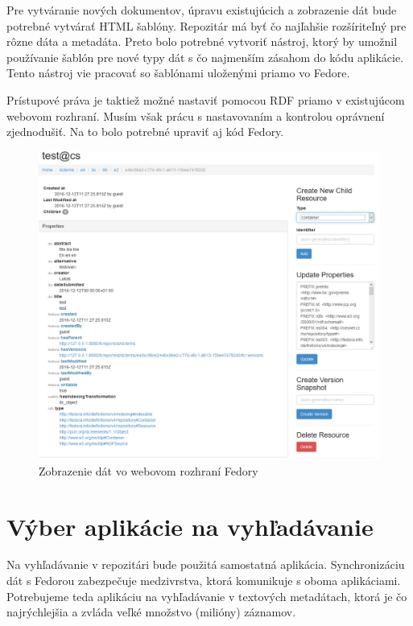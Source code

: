 \documentclass[thesis=M,slovak]{FITthesis}[2013/05/06]
\begin{document}
Pre vytváranie nových dokumentov, úpravu existujúcich a zobrazenie dát bude potrebné vytvárať HTML šablóny. Repozitár má byť čo najľahšie rozšíriteľný pre rôzne dáta a metadáta. Preto bolo potrebné vytvoriť nástroj, ktorý by umožnil používanie šablón pre nové typy dát s čo najmenším zásahom do kódu aplikácie. Tento nástroj vie pracovať so šablónami uloženými priamo vo Fedore.

Prístupové práva je taktiež možné nastaviť pomocou RDF priamo v existujúcom webovom rozhraní. Musím však prácu s nastavovaním a kontrolou oprávnení zjednodušiť. Na to bolo potrebné upraviť aj kód Fedory.

\begin{figure}\centering
	\includegraphics[width=1.0\textwidth]{fedora/dcterms_vo_Fedore.png}
 	\caption[Zobrazenie dát vo webovom rozhraní Fedory]{Zobrazenie dát vo webovom rozhraní Fedory}\label{graphics:fedora}
\end{figure}

\section{Výber aplikácie na vyhľadávanie}
Na vyhľadávanie v repozitári bude použitá samostatná aplikácia. Synchronizáciu dát s Fedorou zabezpečuje medzivrstva, ktorá komunikuje s oboma aplikáciami. Potrebujeme teda aplikáciu na vyhľadávanie v textových metadátach, ktorá je čo najrýchlejšia a zvláda veľké množstvo (milióny) záznamov.
\end{document}
